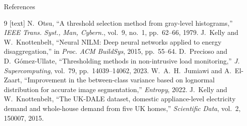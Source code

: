 \begin{frame}{References}
  \footnotesize
  \begin{thebibliography}{9}
    [text]
     N.~Otsu, ``A threshold selection method from gray-level histograms,'' \emph{IEEE Trans. Syst., Man, Cybern.}, vol.~9, no.~1, pp.~62--66, 1979.
     J.~Kelly and W.~Knottenbelt, ``Neural NILM: Deep neural networks applied to energy disaggregation,'' in \emph{Proc. ACM BuildSys}, 2015, pp.~55--64.
     D.~Precioso and D.~G\'omez-Ullate, ``Thresholding methods in non-intrusive load monitoring,'' \emph{J. Supercomputing}, vol.~79, pp.~14039--14062, 2023.
     W.~A.~H.~Jumiawi and A.~El-Zaart, ``Improvement in the between-class variance based on lognormal distribution for accurate image segmentation,'' \emph{Entropy}, 2022.
     J.~Kelly and W.~Knottenbelt, ``The UK-DALE dataset, domestic appliance-level electricity demand and whole-house demand from five UK homes,'' \emph{Scientific Data}, vol.~2, 150007, 2015.
  \end{thebibliography}
\end{frame}
